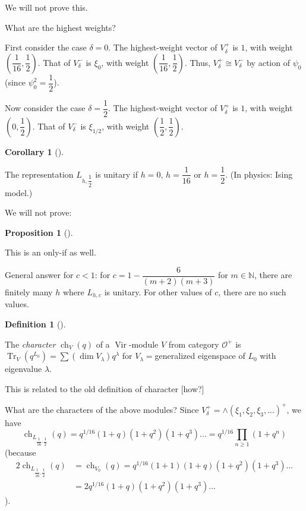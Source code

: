 \documentclass
[numbers=enddot,12pt,final,onecolumn,german,notitlepage]{scrartcl}%
\theoremstyle{definition}
\newtheorem{prop}[theo]{Proposition}
\newenvironment{proposition}[1][]
{\begin{prop}[#1]\begin{leftbar}}
{\end{leftbar}\end{prop}}
\newtheorem{defi}[theo]{Definition}
\newenvironment{definition}[1][]
{\begin{defi}[#1]\begin{leftbar}}
{\end{leftbar}\end{defi}}
\newtheorem{coro}[theo]{Corollary}
\newenvironment{corollary}[1][]
{\begin{coro}[#1]\begin{leftbar}}
{\end{leftbar}\end{coro}}
\begin{document}
We will not prove this.

What are the highest weights?

First consider the case $\delta=0$. The highest-weight vector of $V_{\delta
}^{+}$ is $1$, with weight $\left(  \dfrac{1}{16},\dfrac{1}{2}\right)  $. That
of $V_{\delta}^{-}$ is $\xi_{0}$, with weight $\left(  \dfrac{1}{16},\dfrac
{1}{2}\right)  $. Thus, $V_{\delta}^{+}\cong V_{\delta}^{-}$ by action of
$\psi_{0}$ (since $\psi_{0}^{2}=\dfrac{1}{2}$).

Now consider the case $\delta=\dfrac{1}{2}$. The highest-weight vector of
$V_{\delta}^{+}$ is $1$, with weight $\left(  0,\dfrac{1}{2}\right)  $. That
of $V_{\delta}^{-}$ is $\xi_{1/2}$, with weight $\left(  \dfrac{1}{2}%
,\dfrac{1}{2}\right)  $.

\begin{corollary}
The representation $L_{h,\dfrac{1}{2}}$ is unitary if $h=0$, $h=\dfrac{1}{16}$
or $h=\dfrac{1}{2}$. (In physics: Ising model.)
\end{corollary}

We will not prove:

\begin{proposition}
This is an only-if as well.
\end{proposition}

General answer for $c<1$: for $c=1-\dfrac{6}{\left(  m+2\right)  \left(
m+3\right)  }$ for $m\in\mathbb{N}$, there are finitely many $h$ where
$L_{h,c}$ is unitary. For other values of $c$, there are no such values.

\begin{definition}
The \textit{character }$\operatorname*{ch}\nolimits_{V}\left(  q\right)  $ of
a $\operatorname*{Vir}$-module $V$ from category $\mathcal{O}^{+}$ is
$\operatorname*{Tr}\nolimits_{V}\left(  q^{L_{0}}\right)  =\sum\left(  \dim
V_{\lambda}\right)  q^{\lambda}$ for $V_{\lambda}=$generalized eigenspace of
$L_{0}$ with eigenvalue $\lambda$.
\end{definition}

This is related to the old definition of character [how?]

What are the characters of the above modules? Since $V_{\delta}^{+}%
=\wedge\left(  \xi_{1},\xi_{2},\xi_{3},...\right)  ^{+}$, we have%
\[
\operatorname*{ch}\nolimits_{L_{\dfrac{1}{16},\dfrac{1}{2}}}\left(  q\right)
=q^{1/16}\left(  1+q\right)  \left(  1+q^{2}\right)  \left(  1+q^{3}\right)
...=q^{1/16}\prod\limits_{n\geq1}\left(  1+q^{n}\right)
\]
(because
\begin{align*}
2\operatorname*{ch}\nolimits_{L_{\dfrac{1}{16},\dfrac{1}{2}}}\left(  q\right)
&  =\operatorname*{ch}\nolimits_{V_{0}}\left(  q\right)  =q^{1/16}\left(
1+1\right)  \left(  1+q\right)  \left(  1+q^{2}\right)  \left(  1+q^{3}%
\right)  ...\\
&  =2q^{1/16}\left(  1+q\right)  \left(  1+q^{2}\right)  \left(
1+q^{3}\right)  ...
\end{align*}
).
\end{document}
